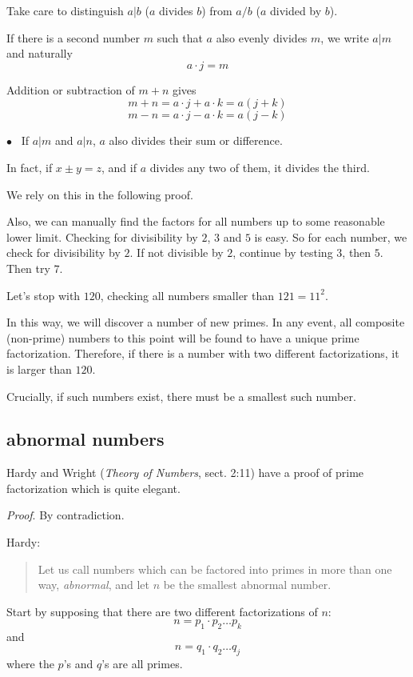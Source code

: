 \documentclass[11pt, oneside]{article}
\begin{document}
Take care to distinguish $a|b$ ($a$ divides $b$) from $a/b$ ($a$ divided by $b$).

If there is a second number $m$ such that $a$ also evenly divides $m$, we write $a|m$ and naturally
\[ a \cdot j = m \]

Addition or subtraction of $m + n$ gives
\[ m + n = a \cdot j + a \cdot k = a(j + k) \]
\[ m - n = a \cdot j - a \cdot k = a(j - k) \]

$\bullet$ \ If $a|m$ and $a|n$, $a$ also divides their sum or difference.

In fact, if $x \pm y = z$, and if $a$ divides any two of them, it divides the third.

We rely on this in the following proof.

Also, we can manually find the factors for all numbers up to some reasonable lower limit.  Checking for divisibility by $2$, $3$ and $5$ is easy. So for each number, we check for divisibility by $2$.  If not divisible by $2$, continue by testing $3$, then $5$.  Then try $7$.

Let's stop with $120$, checking all numbers smaller than $121 = 11^2$.

In this way, we will discover a number of new primes.  In any event, all composite (non-prime) numbers to this point will be found to have a unique prime factorization.  Therefore, if there is a number with two different factorizations, it is larger than $120$.

Crucially, if such numbers exist, there must be a smallest such number.

\subsection*{abnormal numbers}

Hardy and Wright (\emph{Theory of Numbers}, sect. 2:11) have a proof of prime factorization which is quite elegant.

\emph{Proof}.  By contradiction.

Hardy:
\begin{quote}Let us call numbers which can be factored into primes in more than one way, \emph{abnormal}, and let $n$ be the smallest abnormal number.\end{quote}

Start by supposing that there are two different factorizations of $n$:
\[ n = p_1 \cdot p_2 \dots p_k \]
and
\[ n = q_1 \cdot q_2 \dots q_j \]
where the $p$'s and $q$'s are all primes.
\end{document}
